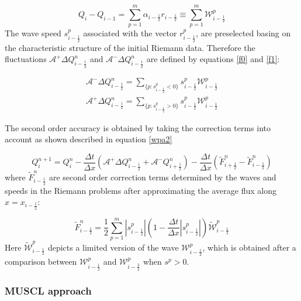 \documentclass[10pt,a4paper]{article}
\begin{document}
\begin{equation}
	Q_{i} -  Q_{i-1} = \sum_{p=1}^{m}  \alpha_{i-\frac{1}{2}} r_{i-\frac{1}{2}} \equiv \sum_{p=1}^{m} \mathcal{W}_{i-\frac{1}{2}}^{p}
	\label{wpa19}
\end{equation}
The wave speed $s_{i-\frac{1}{2}}^{p}$ associated with the vector $r_{i-\frac{1}{2}}^{p}$, are preselected basing on the characteristic structure of the initial Riemann data. Therefore the fluctuations $\mathcal{A^{+}}\Delta Q_{i-\frac{1}{2}}^{n}$  and $\mathcal{A^{-}}\Delta Q_{i-\frac{1}{2}}^{n} $ are defined by equations \eqref{f0} and \eqref{f1}:

\begin{eqnarray}
	\mathcal{A^{-}}\Delta Q_{i-\frac{1}{2}}^{n} = \sum_{\{ p:s_{i-\frac{1}{2}}^{p}<0\}} s_{i-\frac{1}{2}}^{p} \mathcal{W}_{i-\frac{1}{2}}^{p}
	\label{f0}\\
	\mathcal{A^{+}}\Delta Q_{i-\frac{1}{2}}^{n} =\sum_{\{ p:s_{i-\frac{1}{2}}^{p}>0\}} s_{i-\frac{1}{2}}^{p} \mathcal{W}_{i-\frac{1}{2}}^{p}
	\label{f1}
\end{eqnarray}

	The second order accuracy is obtained by taking the correction terms into account as shown described in equation \eqref{wpa2} 

\begin{equation}
	Q_{i}^{n+1} =  Q_{i}^{n} - \frac{\Delta t}{\Delta x}(\mathcal{A^{+}}\Delta 	Q_{i-\frac{1}{2}}^{n} + \mathcal{A^{-}}Q_{i+\frac{1}{2}}^{n}) -  \frac{\Delta t}{\Delta x} (\tilde{F}_{i+\frac{1}{2}}^{n} - \tilde{F}_{i-\frac{1}{2}}^{n} )
	\label{wpa2}
\end{equation}
where $\tilde{F}_{i-\frac{1}{2}}^{n} $ are second order correction terms determined by the waves and speeds in the Riemann problems after approximating the average flux along  $x = x_{i - \frac{1}{2}}$:

\begin{equation}
	\tilde{F}_{i-\frac{1}{2}}^{n} = \frac{1}{2} \sum_{p=1}^{m}  |s_{i- \frac{1}{2}}^{p}| \left( 1 - \frac{\Delta t}{\Delta x} |s_{i- \frac{1}{2}}^{p}|\right) \tilde{\mathcal{W}}_{i-\frac{1}{2}}^{p} 
	\label{wpa13}
\end{equation}
Here $\tilde{\mathcal{W}}_{i-\frac{1}{2}}^{p} $ depicts a limited version of the wave $\mathcal{W}_{i-\frac{1}{2}}^{p} $, which is obtained after a comparison between $\mathcal{W}_{i-\frac{1}{2}}^{p} $ and $\mathcal{W}_{i-\frac{3}{2}}^{p} $ when $s^{p} >0$.

	\subsubsection{MUSCL approach}
\end{document}
